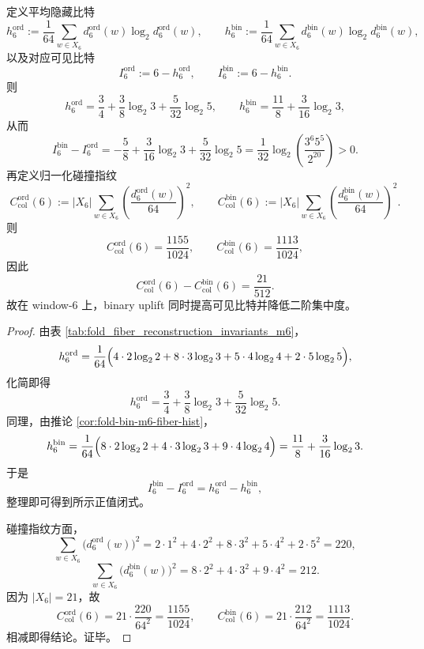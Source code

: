 \begin{proposition}\label{prop:conclusion-window6-visible-bits-collision-drop}
定义平均隐藏比特
\[
h_6^{\mathrm{ord}}:=
\frac{1}{64}\sum_{w\in X_6} d_6^{\mathrm{ord}}(w)\log_2 d_6^{\mathrm{ord}}(w),
\qquad
h_6^{\mathrm{bin}}:=
\frac{1}{64}\sum_{w\in X_6} d_6^{\mathrm{bin}}(w)\log_2 d_6^{\mathrm{bin}}(w),
\]
以及对应可见比特
\[
I_6^{\mathrm{ord}}:=6-h_6^{\mathrm{ord}},
\qquad
I_6^{\mathrm{bin}}:=6-h_6^{\mathrm{bin}}.
\]
则
\[
h_6^{\mathrm{ord}}=
\frac34+\frac38\log_2 3+\frac5{32}\log_2 5,
\qquad
h_6^{\mathrm{bin}}=
\frac{11}{8}+\frac3{16}\log_2 3,
\]
从而
\[
I_6^{\mathrm{bin}}-I_6^{\mathrm{ord}}
=
-\frac58+\frac3{16}\log_2 3+\frac5{32}\log_2 5
=
\frac{1}{32}\log_2\!\left(\frac{3^6 5^5}{2^{20}}\right)
>0.
\]
再定义归一化碰撞指纹
\[
C_{\mathrm{col}}^{\mathrm{ord}}(6)
:=|X_6|\sum_{w\in X_6}\left(\frac{d_6^{\mathrm{ord}}(w)}{64}\right)^2,
\qquad
C_{\mathrm{col}}^{\mathrm{bin}}(6)
:=|X_6|\sum_{w\in X_6}\left(\frac{d_6^{\mathrm{bin}}(w)}{64}\right)^2.
\]
则
\[
C_{\mathrm{col}}^{\mathrm{ord}}(6)=\frac{1155}{1024},
\qquad
C_{\mathrm{col}}^{\mathrm{bin}}(6)=\frac{1113}{1024},
\]
因此
\[
C_{\mathrm{col}}^{\mathrm{ord}}(6)-C_{\mathrm{col}}^{\mathrm{bin}}(6)=\frac{21}{512}.
\]
故在 window-\(6\) 上，binary uplift 同时提高可见比特并降低二阶集中度。
\end{proposition}
\begin{proof}
由表 \ref{tab:fold_fiber_reconstruction_invariants_m6}，
\[
h_6^{\mathrm{ord}}
=
\frac{1}{64}\Bigl(
4\cdot 2\log_2 2
+8\cdot 3\log_2 3
+5\cdot 4\log_2 4
+2\cdot 5\log_2 5
\Bigr),
\]
化简即得
\[
h_6^{\mathrm{ord}}=
\frac34+\frac38\log_2 3+\frac5{32}\log_2 5.
\]
同理，由推论 \ref{cor:fold-bin-m6-fiber-hist}，
\[
h_6^{\mathrm{bin}}
=
\frac{1}{64}\Bigl(
8\cdot 2\log_2 2
+4\cdot 3\log_2 3
+9\cdot 4\log_2 4
\Bigr)
=
\frac{11}{8}+\frac3{16}\log_2 3.
\]
于是
\[
I_6^{\mathrm{bin}}-I_6^{\mathrm{ord}}
=h_6^{\mathrm{ord}}-h_6^{\mathrm{bin}},
\]
整理即可得到所示正值闭式。

碰撞指纹方面，
\[
\sum_{w\in X_6}\bigl(d_6^{\mathrm{ord}}(w)\bigr)^2
=
2\cdot 1^2+4\cdot 2^2+8\cdot 3^2+5\cdot 4^2+2\cdot 5^2
=220,
\]
\[
\sum_{w\in X_6}\bigl(d_6^{\mathrm{bin}}(w)\bigr)^2
=
8\cdot 2^2+4\cdot 3^2+9\cdot 4^2
=212.
\]
因为 \(|X_6|=21\)，故
\[
C_{\mathrm{col}}^{\mathrm{ord}}(6)=21\cdot\frac{220}{64^2}=\frac{1155}{1024},
\qquad
C_{\mathrm{col}}^{\mathrm{bin}}(6)=21\cdot\frac{212}{64^2}=\frac{1113}{1024}.
\]
相减即得结论。证毕。
\end{proof}

